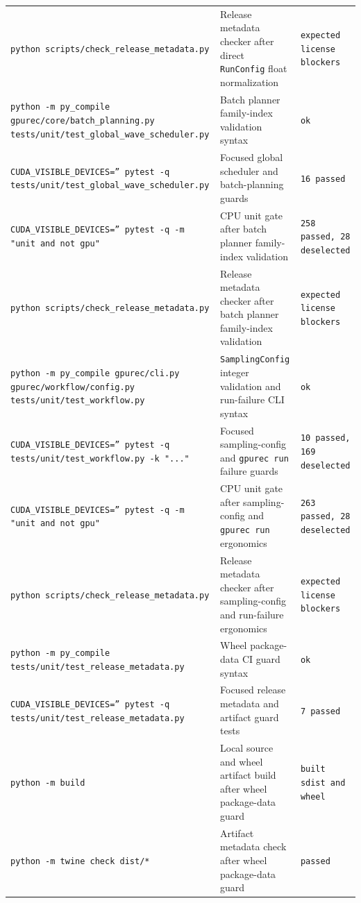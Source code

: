 \documentclass[11pt]{article}
\begin{document}
\begin{center}
\begin{tabular}{lll}
\texttt{python scripts/check\_release\_metadata.py} &
Release metadata checker after direct \texttt{RunConfig} float normalization &
\texttt{expected license blockers} \\
\texttt{python -m py\_compile gpurec/core/batch\_planning.py tests/unit/test\_global\_wave\_scheduler.py} &
Batch planner family-index validation syntax &
\texttt{ok} \\
\texttt{CUDA\_VISIBLE\_DEVICES='' pytest -q tests/unit/test\_global\_wave\_scheduler.py} &
Focused global scheduler and batch-planning guards &
\texttt{16 passed} \\
\texttt{CUDA\_VISIBLE\_DEVICES='' pytest -q -m "unit and not gpu"} &
CPU unit gate after batch planner family-index validation &
\texttt{258 passed, 28 deselected} \\
\texttt{python scripts/check\_release\_metadata.py} &
Release metadata checker after batch planner family-index validation &
\texttt{expected license blockers} \\
\texttt{python -m py\_compile gpurec/cli.py gpurec/workflow/config.py tests/unit/test\_workflow.py} &
\texttt{SamplingConfig} integer validation and run-failure CLI syntax &
\texttt{ok} \\
\texttt{CUDA\_VISIBLE\_DEVICES='' pytest -q tests/unit/test\_workflow.py -k "..."} &
Focused sampling-config and \texttt{gpurec run} failure guards &
\texttt{10 passed, 169 deselected} \\
\texttt{CUDA\_VISIBLE\_DEVICES='' pytest -q -m "unit and not gpu"} &
CPU unit gate after sampling-config and \texttt{gpurec run} ergonomics &
\texttt{263 passed, 28 deselected} \\
\texttt{python scripts/check\_release\_metadata.py} &
Release metadata checker after sampling-config and run-failure ergonomics &
\texttt{expected license blockers} \\
\texttt{python -m py\_compile tests/unit/test\_release\_metadata.py} &
Wheel package-data CI guard syntax &
\texttt{ok} \\
\texttt{CUDA\_VISIBLE\_DEVICES='' pytest -q tests/unit/test\_release\_metadata.py} &
Focused release metadata and artifact guard tests &
\texttt{7 passed} \\
\texttt{python -m build} &
Local source and wheel artifact build after wheel package-data guard &
\texttt{built sdist and wheel} \\
\texttt{python -m twine check dist/*} &
Artifact metadata check after wheel package-data guard &
\texttt{passed} \\

\end{tabular}
\end{center}
\end{document}
